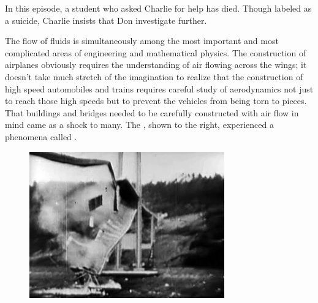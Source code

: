 \newpage
{}
{}
\setcounter{activity}{0}

In this episode, a student who asked Charlie for help has died.  Though labeled as a suicide, Charlie insists that Don investigate further. \\



The flow of fluids is simultaneously among the most important and most complicated areas of engineering and mathematical physics. The construction of airplanes obviously requires the understanding of air flowing across the wings; it doesn't take much stretch of the imagination to realize that the construction of high speed automobiles and trains requires careful study of aerodynamics not just to reach those high speeds but to prevent the vehicles from being torn to pieces. That buildings and bridges needed to be carefully constructed with air flow in mind came as a shock to many. The , shown to the right, experienced a phenomena called .
	\begin{figure}[H]
	\centering
	\includegraphics[width=0.75\textwidth]{../sections/seasons/season1/105/images/105a.png} 
	\end{figure}


